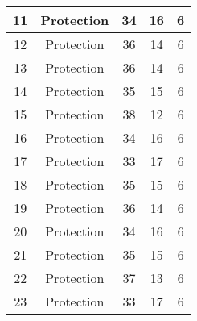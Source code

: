\documentclass[results.tex]{subfiles}
\begin{document}
\begin{center}
\begin{tabular}{| c || c | c | c | c |}
            \hline
            11                      & Protection                   & 34                     & 16                      & 6                    \\
            \hline
            12                      & Protection                   & 36                     & 14                      & 6                    \\
            \hline
            13                      & Protection                   & 36                     & 14                      & 6                    \\
            \hline
            14                      & Protection                   & 35                     & 15                      & 6                    \\
            \hline
            15                      & Protection                   & 38                     & 12                      & 6                    \\
            \hline
            16                      & Protection                   & 34                     & 16                      & 6                    \\
            \hline
            17                      & Protection                   & 33                     & 17                      & 6                    \\
            \hline
            18                      & Protection                   & 35                     & 15                      & 6                    \\
            \hline
            19                      & Protection                   & 36                     & 14                      & 6                    \\
            \hline
            20                      & Protection                   & 34                     & 16                      & 6                    \\
            \hline
            21                      & Protection                   & 35                     & 15                      & 6                    \\
            \hline
            22                      & Protection                   & 37                     & 13                      & 6                    \\
            \hline
            23                      & Protection                   & 33                     & 17                      & 6                    \\

\end{tabular}
\end{center}
\end{document}
